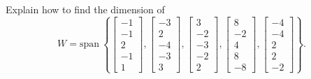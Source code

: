 \documentclass{article}
\begin{document}
\begin{exerciseStatement}
    Explain how to find the dimension of
\[W=\mathrm{span}\ \left\{\left[\begin{array}{r}
-1 \\
-1 \\
2 \\
-1 \\
1
\end{array}\right] , \left[\begin{array}{r}
-3 \\
2 \\
-4 \\
-3 \\
3
\end{array}\right] , \left[\begin{array}{r}
3 \\
-2 \\
-3 \\
-2 \\
2
\end{array}\right] , \left[\begin{array}{r}
8 \\
-2 \\
4 \\
8 \\
-8
\end{array}\right] , \left[\begin{array}{r}
-4 \\
-4 \\
2 \\
2 \\
-2
\end{array}\right]\right\}.\]



  
\end{exerciseStatement}
\end{document}
